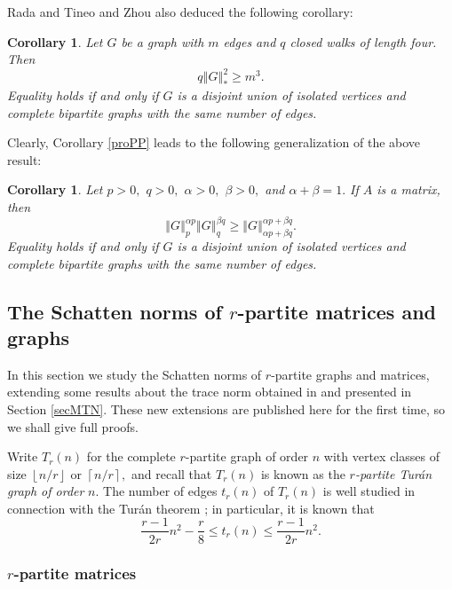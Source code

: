 \documentclass[12pt]{article}%
\newtheorem{corollary}[theorem]{Corollary}
\begin{document}
Rada and Tineo \cite{RaTi04} and Zhou \cite{Zho04} also deduced the following corollary:

\begin{corollary}
Let $G$ be a graph with $m$ edges and $q$ closed walks of length four. Then%
\[
q\left\Vert G\right\Vert _{\ast}^{2}\geq m^{3}.
\]
Equality holds if and only if $G$ is a disjoint union of isolated vertices and
complete bipartite graphs with the same number of edges.
\end{corollary}

Clearly, Corollary \ref{proPP} leads to the following generalization of the
above result:

\begin{corollary}
\label{cor4}Let $p>0,$ $q>0,$ $\alpha>0,$ $\beta>0,$ and $\alpha+\beta=1.$ If
$A$ is a matrix, then
\[
\left\Vert G\right\Vert _{p}^{\alpha p}\left\Vert G\right\Vert _{q}^{\beta
q}\geq\left\Vert G\right\Vert _{\alpha p+\beta q}^{\alpha p+\beta q}.
\]
Equality holds if and only if $G$ is a disjoint union of isolated vertices and
complete bipartite graphs with the same number of edges.
\end{corollary}

\subsection{\label{SSr}The Schatten norms of $r$-partite matrices and graphs}

In this section we study the Schatten norms of $r$-partite graphs and
matrices, extending some results about the trace norm obtained in
\cite{Nik15a} and presented in Section \ref{secMTN}. These new extensions are
published here for the first time, so we shall give full proofs.\medskip

Write $T_{r}\left(  n\right)  $ for the complete $r$-partite graph of order
$n$ with vertex classes of size $\left\lfloor n/r\right\rfloor $ or
$\left\lceil n/r\right\rceil ,$ and recall that $T_{r}\left(  n\right)  $ is
known as the $r$\emph{-partite Tur\'{a}n graph of order }$n.$ The number of
edges $t_{r}\left(  n\right)  $ of $T_{r}\left(  n\right)  $ is well studied
in connection with the Tur\'{a}n theorem \cite{Tur41}; in particular, it is
known that%
\[
\frac{r-1}{2r}n^{2}-\frac{r}{8}\leq t_{r}\left(  n\right)  \leq\frac{r-1}%
{2r}n^{2}.
\]


\subsubsection{$r$-partite matrices}
\end{document}
